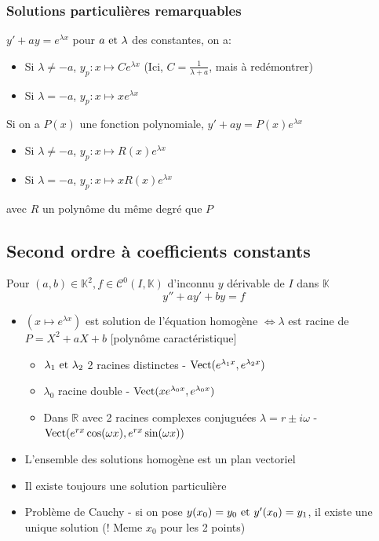\documentclass[openany]{book}
\begin{document}
\subsubsection{Solutions particulières remarquables}
$y' + ay = e^{\lambda x}$ pour $a \text{ et } \lambda$ des constantes,  on a:
\begin{itemize}
    \item Si $\lambda \neq -a$, $y_p : x \mapsto Ce^{\lambda x}$ (Ici, $C = \frac{1}{\lambda + a}$, mais à redémontrer)
    \item Si $\lambda = -a$, $y_p : x \mapsto xe^{\lambda x}$
\end{itemize}

\noindent Si on a $P(x)$ une fonction polynomiale, $y' + ay = P(x)e^{\lambda x}$ 
\begin{itemize}
    \item Si $\lambda \neq -a$, $y_p : x \mapsto R(x)e^{\lambda x}$
    \item Si $\lambda = -a$, $y_p : x \mapsto xR(x)e^{\lambda x}$
\end{itemize}
\noindent avec $R$ un polynôme du même degré que $P$

\subsection{Second ordre à coefficients constants}
Pour $(a, b) \in \mathbb{K}^2, f \in \mathcal{C}^0(I, \mathbb{K})$ d'inconnu $y$ dérivable de $I$ dans $\mathbb{K}$
\[ y'' + ay'+ by = f \]

\begin{itemize}
    \item $ (x \mapsto e^{\lambda x}) $ est solution de l'équation homogène $ \iff \lambda $ est racine de $ P = X^2 + aX + b $ [polynôme caractéristique]
    \begin{itemize}
        \item $\lambda_1 \text{ et } \lambda_2$ 2 racines distinctes - $\text{Vect} (e^{\lambda_1 x}, e^{\lambda_2 x})$
        \item $\lambda_0$ racine double - $\text{Vect} (xe^{\lambda_0 x}, e^{\lambda_0 x})$
        \item Dans $\mathbb{R}$ avec 2 racines complexes conjuguées $\lambda = r \pm i \omega$ - $\text{Vect} (e^{rx} \cos (\omega x), e^{rx} \sin(\omega x))$
    \end{itemize}
    \item L'ensemble des solutions homogène est un plan vectoriel
    \item Il existe toujours une solution particulière
    \item Problème de Cauchy - si on pose $y(x_0) = y_0 \text{ et } y'(x_0) = y_1$, il existe une unique solution (! Meme $x_0$ pour les 2 points)
\end{itemize}
\end{document}
